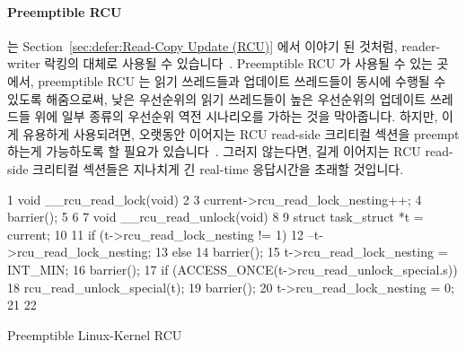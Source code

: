 \paragraph{Preemptible RCU}
는
Section~\ref{sec:defer:Read-Copy Update (RCU)} 에서 이야기 된 것처럼,
reader-writer 락킹의 대체로 사용될 수 있습니다~\cite{PaulEMcKenney2007WhatIsRCUFundamentally,PaulMcKenney2012RCUUsage,PaulEMcKenney2014RCUAPI}.
Preemptible RCU 가 사용될 수 있는 곳에서, preemptible RCU 는 읽기 쓰레드들과
업데이트 쓰레드들이 동시에 수행될 수 있도록 해줌으로써, 낮은 우선순위의 읽기
쓰레드들이 높은 우선순위의 업데이트 쓰레드들 위에 일부 종류의 우선순위 역전
시나리오를 가하는 것을 막아줍니다.
하지만, 이게 유용하게 사용되려면, 오랫동안 이어지는 RCU read-side 크리티컬
섹션을 preempt 하는게 가능하도록 할 필요가
있습니다~\cite{DinakarGuniguntala2008IBMSysJ}.
그러지 않는다면, 길게 이어지는 RCU read-side 크리티컬 섹션들은 지나치게 긴
real-time 응답시간을 초래할 것입니다.

\begin{listing}[tb]
{ \scriptsize
\begin{verbbox}
 1 void __rcu_read_lock(void)
 2 {
 3   current->rcu_read_lock_nesting++;
 4   barrier();
 5 }
 6 
 7 void __rcu_read_unlock(void)
 8 {
 9   struct task_struct *t = current;
10 
11   if (t->rcu_read_lock_nesting != 1) {
12     --t->rcu_read_lock_nesting;
13   } else {
14     barrier();
15     t->rcu_read_lock_nesting = INT_MIN;
16     barrier();
17     if (ACCESS_ONCE(t->rcu_read_unlock_special.s))
18       rcu_read_unlock_special(t);
19     barrier();
20     t->rcu_read_lock_nesting = 0;
21   }
22 }
\end{verbbox}
}
\centering
\theverbbox
\caption{Preemptible Linux-Kernel RCU}
\label{lst:advsync:Preemptible Linux-Kernel RCU}
\end{listing}

